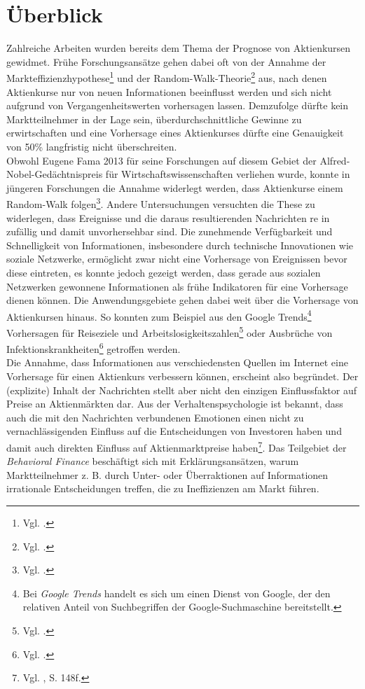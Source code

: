 \documentclass[
	a4paper,
	12pt,
	bibliography=totocnumbered,
	twoside,
]{scrreprt}
\begin{document}
\section{Überblick}
Zahlreiche Arbeiten wurden bereits dem Thema der Prognose von Aktienkursen gewidmet. Frühe Forschungsansätze gehen dabei oft von der Annahme der Markteffizienzhypothese\footnote{Vgl. \citet{fama1965}.} und der Random-Walk-Theorie\footnote{Vgl. \citet{fama1969}.} aus, nach denen Aktienkurse nur von neuen Informationen beeinflusst werden und sich nicht aufgrund von Vergangenheitswerten vorhersagen lassen. Demzufolge dürfte kein Marktteilnehmer in der Lage sein, überdurchschnittliche Gewinne zu erwirtschaften und eine Vorhersage eines Aktienkurses dürfte eine Genauigkeit von 50\% langfristig nicht überschreiten.\\

Obwohl Eugene Fama 2013 für seine Forschungen auf diesem Gebiet der Alf\-red-Nobel-Ge\-dächt\-nis\-preis für Wirtschaftswissenschaften verliehen wurde, konnte in jüngeren Forschungen die Annahme widerlegt werden, dass Aktienkurse einem Random-Walk folgen\footnote{Vgl. \citet{qian2007}.}. Andere Untersuchungen versuchten die These zu widerlegen, dass Ereignisse und die daraus resultierenden Nachrichten re	in zufällig und damit unvorhersehbar sind. Die zunehmende Verfügbarkeit und Schnelligkeit von Informationen, insbesondere durch technische Innovationen wie soziale Netzwerke, ermöglicht zwar nicht eine Vorhersage von Ereignissen bevor diese eintreten, es konnte jedoch gezeigt werden, dass gerade aus sozialen Netzwerken gewonnene Informationen als frühe Indikatoren für eine Vorhersage dienen können. Die Anwendungsgebiete gehen dabei weit über die Vorhersage von Aktienkursen hinaus. So konnten zum Beispiel aus den Google Trends\footnote{Bei \textit{Google Trends} handelt es sich um einen Dienst von Google, der den relativen Anteil von Suchbegriffen der Google-Suchmaschine bereitstellt.} Vorhersagen für Reiseziele und Arbeitslosigkeitszahlen\footnote{Vgl. \citet{choi2011}.} oder Ausbrüche von Infektionskrankheiten\footnote{Vgl. \citet{pelat2009}.} getroffen werden.\\

Die Annahme, dass Informationen aus verschiedensten Quellen im Internet eine Vorhersage für einen Aktienkurs verbessern können, erscheint also begründet. Der (explizite) Inhalt der Nachrichten stellt aber nicht den einzigen Einflussfaktor auf Preise an Aktienmärkten dar. Aus der Verhaltenspsychologie ist bekannt, dass auch die mit den Nachrichten verbundenen Emotionen einen nicht zu vernachlässigenden Einfluss auf die Entscheidungen von Investoren haben und damit auch direkten Einfluss auf Aktienmarktpreise haben\footnote{Vgl. \citet{nofsinger2003}, S. 148f.}. Das Teilgebiet der \textit{Behavioral Finance} beschäftigt sich mit Erklärungsansätzen, warum Marktteilnehmer z. B. durch Unter- oder Überraktionen auf Informationen irrationale Entscheidungen treffen, die zu Ineffizienzen am Markt führen.\\
\end{document}
